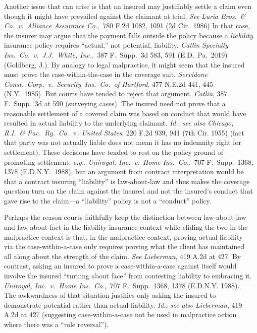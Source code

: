 \documentclass[
  12pt,
  letterpaper,
]{scrartcl}
\begin{document}
Another issue that can arise is that an insured may justifiably settle a claim
even though it might have prevailed against the claimant at trial. \textit{See}
\textit{Luria Bros.~\& Co.~v.~Alliance Assurance Co.},~780 F.2d 1082, 1091 (2d
Cir.~1986) In that case, the insurer may argue that the payment falls outside
the policy because a \emph{liability} insurance policy requires ``actual,'' not
potential, liability. \textit{Catlin Specialty Ins.~Co.~v.~J.J.~White,
Inc.},~387 F.~Supp.~3d 583, 591 (E.D.~Pa.~2019) (Goldberg, J.). By analogy to
legal malpractice, it might seem that the insured must prove the
case-within-the-case in the coverage suit. \textit{Servidone
Const.~Corp.~v.~Security~Ins.~Co.~of Hartford}, 477 N.E.2d 441, 445
(N.Y.~1985). But courts have tended to reject that argument. \textit{Catlin},
387 F.~Supp.~3d at 590 (surveying cases). The insured need not prove that a
reasonable settlement of a covered claim was based on conduct that would have
resulted in actual liability to the underlying claimant. \textit{Id.};
\textit{see also} \textit{Chicago, R.I.~\& Pac.~Ry.~Co.~v.~United States}, 220
F.2d 939, 941 (7th Cir. 1955) (fact that party was not actually liable does not
mean it has no indemnity right for settlement). These decisions have tended to
rest on the policy ground of promoting settlement, \textit{e.g.},
\textit{Uniroyal, Inc.~v.~Home Ins.~Co.},~707 F.~Supp.~1368, 1378
(E.D.N.Y.~1988), but an argument from contract interpretation would be that a
contract insuring ``liability'' is law-about-law and thus makes the coverage
question turn on the claim against the insured and not the insured's conduct
that gave rise to the claim---a ``liability'' policy is not a ``conduct''
policy.

Perhaps the reason courts faithfully keep the distinction between law-about-law
and law-about-fact in the liability insurance context while eliding the two in
the malpractice context is that, in the malpractice context, proving actual
liability via the case-within-a-case only requires proving what the client has
maintained all along about the strength of the claim. \textit{See}
\textit{Lieberman}, 419 A.2d at 427. By contrast, asking an insured to prove a
case-within-a-case against itself would involve the insured ``turning about
face'' from contesting liability to embracing it. \textit{Uniroyal,
Inc.~v.~Home Ins.~Co.},~707 F.~Supp.~1368, 1378 (E.D.N.Y. 1988). The
awkwardness of that situation justifies only asking the insured to demonstrate
potential rather than actual liability. \textit{Id.}; \textit{see also}
\textit{Lieberman}, 419 A.2d at 427 (suggesting case-within-a-case not be used
in malpractice action where there was a ``role reversal'').
\end{document}
